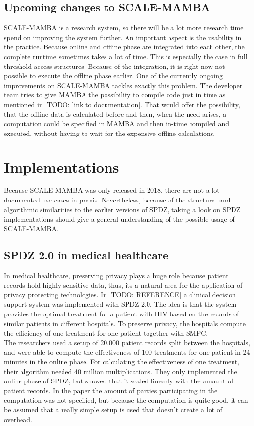 \documentclass[english,runningheads,a4paper]{llncs}[2018/03/10]
\begin{document}
\subsection{Upcoming changes to SCALE-MAMBA}
SCALE-MAMBA is a research system, so there will be a lot more research time spend on improving the system further. An important aspect is the usability in the practice. Because online and offline phase are integrated into each other, the complete runtime sometimes takes a lot of time. This is especially the case in full threshold access structures. Because of the integration, it is right now not possible to execute the offline phase earlier. One of the currently ongoing improvements on SCALE-MAMBA tackles exactly this problem. The developer team tries to give MAMBA the possibility to compile code just in time as mentioned in [TODO: link to documentation]. That would offer the possibility, that the offline data is calculated before and then, when the need arises, a computation could be specified in MAMBA and then in-time compiled and executed, without having to wait for the expensive offline calculations.\\

\section{Implementations}
Because SCALE-MAMBA was only released in 2018, there are not a lot documented use cases in praxis. Nevertheless, because of the structural and algorithmic similarities to the earlier versions of SPDZ, taking a look on SPDZ implementations should give a general understanding of the possible usage of SCALE-MAMBA.\\

\subsection{SPDZ 2.0 in medical healthcare}
In medical healthcare, preserving privacy plays a huge role because patient records hold highly sensitive data, thus, its a natural area for the application of privacy protecting technologies. In [TODO: REFERENCE] a clinical decision support system was implemented with SPDZ 2.0. The idea is that the system provides the optimal treatment for a patient with HIV based on the  records of similar patients in different hospitals. To preserve privacy, the hospitals compute the efficiency of one treatment for one patient together with SMPC.\\
The researchers used a setup of 20.000 patient records split between the hospitals, and were able to compute the effectiveness of 100 treatments for one patient in 24 minutes in the online phase. For calculating the effectiveness of one treatment, their algorithm needed 40 million multiplications. They only implemented the online phase of SPDZ, but showed that it scaled linearly with the amount of patient records. In the paper the amount of parties participating in the computation was not specified, but because the computation is quite good, it can be assumed that a really simple setup is used that doesn't create a lot of overhead.
\end{document}
